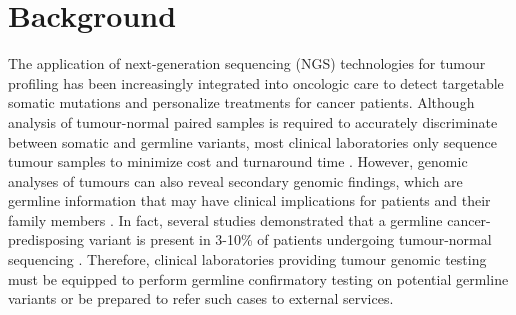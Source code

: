 \documentclass{bmcart}
\begin{document}


\section*{Background}

The application of next-generation sequencing (NGS) technologies for tumour profiling has been increasingly integrated into oncologic care to detect targetable somatic mutations and personalize treatments for cancer patients. Although analysis of tumour-normal paired samples is required to accurately discriminate between somatic and germline variants, most clinical laboratories only sequence tumour samples to minimize cost and turnaround time \cite{Raymond2016}. However, genomic analyses of tumours can also reveal secondary genomic findings, which are germline information that may have clinical implications for patients and their family members \cite{Raymond2016}. In fact, several studies demonstrated that a germline cancer-predisposing variant is present in 3-10\% of patients undergoing tumour-normal sequencing \cite{Raymond2016,Meric-Bernstam2016,Schrader2015,Jones2015}. Therefore, clinical laboratories providing tumour genomic testing must be equipped to perform germline confirmatory testing on potential germline variants or be prepared to refer such cases to external services.
\end{document}
